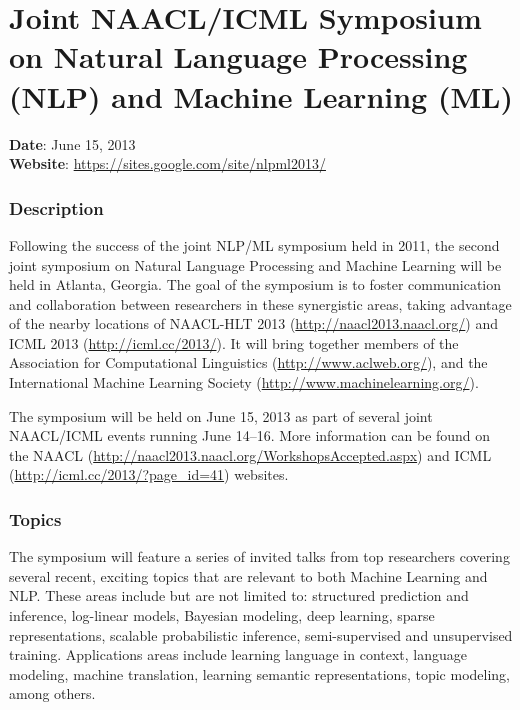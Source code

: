 \vspace*{-3cm}\par
\chapter[Join NAACL/ICML Symposium]{Joint NAACL/ICML Symposium on Natural Language Processing (NLP) and Machine Learning (ML)}
\thispagestyle{emptyheader}

\textbf{Date}: June 15, 2013 \\
\textbf{Website}: \url{https://sites.google.com/site/nlpml2013/}

\subsection*{Description}

Following the success of the joint NLP/ML symposium held in 2011, the second joint symposium on
Natural Language Processing and Machine Learning will be held in Atlanta, Georgia. The goal of the
symposium is to foster communication and collaboration between researchers in these synergistic
areas, taking advantage of the nearby locations of NAACL-HLT 2013
(\url{http://naacl2013.naacl.org/}) and ICML 2013 (\url{http://icml.cc/2013/}). It will bring
together members of the Association for Computational Linguistics (\url{http://www.aclweb.org/}),
and the International Machine Learning Society (\url{http://www.machinelearning.org/}).

The symposium will be held on June 15, 2013 as part of several joint NAACL/ICML events running June
14--16. More information can be found on the NAACL
(\url{http://naacl2013.naacl.org/WorkshopsAccepted.aspx}) and ICML
(\url{http://icml.cc/2013/?page_id=41}) websites.

\subsection*{Topics}

The symposium will feature a series of invited talks from top researchers covering several recent,
exciting topics that are relevant to both Machine Learning and NLP. These areas include but are not
limited to: structured prediction and inference, log-linear models, Bayesian modeling, deep
learning, sparse representations, scalable probabilistic inference, semi-supervised and unsupervised
training. Applications areas include learning language in context, language modeling, machine
translation, learning semantic representations, topic modeling, among others.


